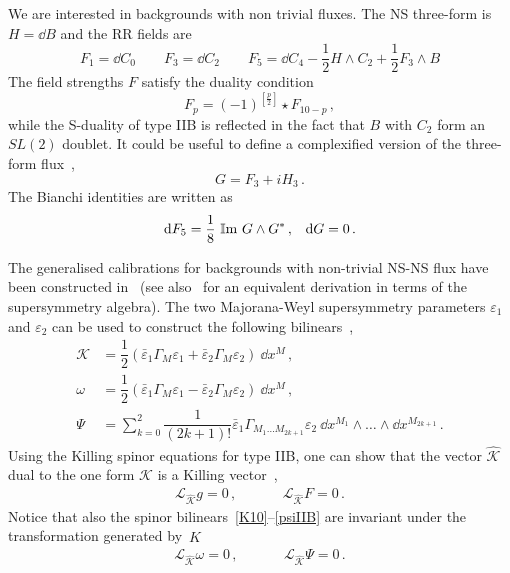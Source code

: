 \documentclass[debug]{phd}
\begin{document}
We are interested in backgrounds with non trivial fluxes. The NS three-form is $H = \dd  B$ and the RR fields are 
%
	\begin{equation} 
	 F_1=\dd  C_0 \qquad 
	 F_3=\dd  C_2 \qquad 
	 F_5=\dd  C_4 - \frac{1}{2} H \wedge C_2 + \frac{1}{2} F_3 \wedge B
	\end{equation} 
%	
The field strengths $F$ satisfy the duality condition
%
	\begin{equation} 
	\label{fdual}
		F_p = (-1)^{\left[\tfrac{p}{2}\right]} \star F_{10-p}\, , 
	\end{equation} 
%
while the S-duality of type IIB is reflected in the fact that $B$ with $C_2$ form an $SL(2)$ doublet. It could be useful to define a complexified version of the three-form flux~\cite{Schwarz:1983qr},
%
	\begin{equation} 
		G = F_3 + i H_3\, .
	\end{equation} 
%
The Bianchi identities are written as
%
	\begin{align}
		& &	\mathrm{d}  F_5= \frac{1}{8}\, \operatorname{\mathbb{I}m}\, G\wedge G^*\, ,
			& & 
		\mathrm{d}  G= 0\, . & & 
	\end{align}
%

The generalised calibrations for backgrounds with non-trivial NS-NS flux have been constructed in~\cite{Martucci:2011dn} (see also~\cite{Cascales:2004qp, HPS04} for an equivalent derivation in terms of the supersymmetry algebra). 
%
The two Majorana-Weyl supersymmetry parameters $\varepsilon_1$ and $\varepsilon_2$ can be used to construct the following bilinears~\cite{BJRT99},
%
	\begin{align}
		\label{K10}
		\mathcal{K} &= \dfrac{1}{2} ( \bar{\varepsilon}_1 \Gamma_M \varepsilon_1 + \bar{\varepsilon}_2 \Gamma_M \varepsilon_2)\ \dd  x^M\, , \\
		\label{omega10}
		\omega &= \dfrac{1}{2} ( \bar{\varepsilon}_1 \Gamma_M \varepsilon_1 - \bar{\varepsilon}_2 \Gamma_M \varepsilon_2)\ \dd  x^M\, , \\
		\label{psiIIB}
		\Psi &= \sum_{k=0}^2 \dfrac{1}{(2 k+ 1)!} \bar{\varepsilon}_1 \Gamma_{M_1 \ldots M_{2k +1} } \varepsilon_2 \ \dd  x^{M_1} \wedge \ldots \wedge \dd  x^{M_{2k +1}} \, . 
	\end{align}
%
Using the Killing spinor equations for type IIB, one can show that the vector $\hat{\mathcal{K}}$ dual to the one form $\mathcal{K}$ is a Killing vector~\cite{Tomasiello:2011eb},
%
	\begin{equation} 
		\begin{array}{ccc}
			\mathcal{L}_{\hat{\mathcal{K}}} g = 0\, ,& \phantom{and}& \mathcal{L}_{\hat{\mathcal{K}}} F = 0 \, . 
		\end{array}
	\end{equation} 
%
Notice that also the spinor bilinears~\eqref{K10}--\eqref{psiIIB} are invariant under the transformation generated by~$\hat{K}$
%
	\begin{equation} 
		\begin{array}{ccc}
			\mathcal{L}_{\hat{\mathcal{K}}} \omega = 0\, , & \phantom{and} & \mathcal{L}_{\hat{\mathcal{K}}} \Psi = 0 \, .
		\end{array}
	\end{equation} 
%
\end{document}
